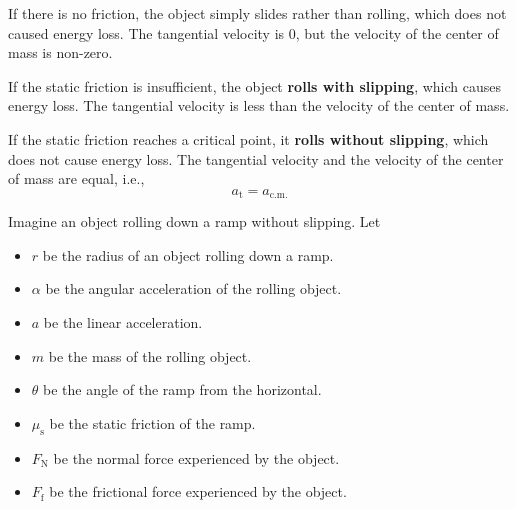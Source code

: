 If there is no friction, the object simply slides rather than rolling,
which does not caused energy loss.
The tangential velocity is 0,
but the velocity of the center of mass is non-zero.

If the static friction is insufficient, the object \textbf{rolls with slipping},
which causes energy loss.
The tangential velocity is less than the velocity of the center of mass.

If the static friction reaches a critical point, it \textbf{rolls
without slipping},
which does not cause energy loss.
The tangential velocity and the velocity of the center of mass are equal, i.e.,
\begin{equation}
    a_\mathrm{t} = a_\mathrm{c.m.}
\end{equation}

Imagine an object rolling down a ramp without slipping.
Let
\begin{itemize}
    \item \(r\) be the radius of an object rolling down a ramp.
    \item \(\alpha\) be the angular acceleration of the rolling object.
    \item \(a\) be the linear acceleration.
    \item \(m\) be the mass of the rolling object.
    \item \(\theta\) be the angle of the ramp from the horizontal.
    \item \(\mu_\mathrm{s}\) be the static friction of the ramp.
    \item \(F_\mathrm{N}\) be the normal force experienced by the object.
    \item \(F_\mathrm{f}\) be the frictional force experienced by the object.
\end{itemize}

